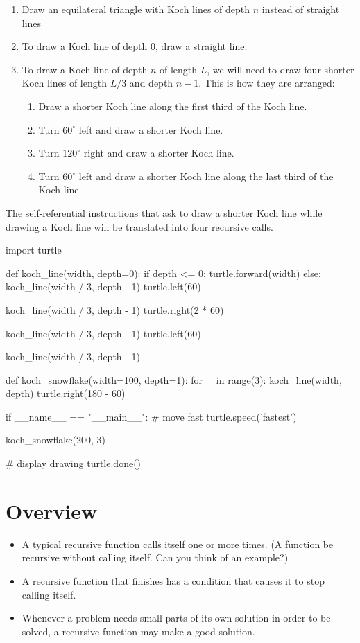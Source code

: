 \documentclass[11pt]{cselabheader}
\begin{document}
\begin{enumerate}
\item Draw an equilateral triangle with Koch lines of depth $n$
instead of straight lines
\item To draw a Koch line of depth $0$, draw a straight line.
\item To draw a Koch line of depth $n$ of length $L$, we will need to
draw four shorter Koch lines of length $L / 3$ and depth $n-1$.  This
is how they are arranged:
\begin{enumerate}
\item Draw a shorter Koch line along the first third of the Koch line.
\item Turn $60^\circ$ left and draw a shorter Koch line.
\item Turn $120^\circ$ right and draw a shorter Koch line.
\item Turn $60^\circ$ left and draw a shorter Koch line along the last
third of the Koch line.
\end{enumerate}
\end{enumerate}

The self-referential instructions that ask to draw a shorter Koch line
while drawing a Koch line will be translated into four recursive calls.

\begin{python3code}
import turtle

def koch_line(width, depth=0):
    if depth <= 0:
        turtle.forward(width)
    else:
        koch_line(width / 3, depth - 1)
        turtle.left(60)

        koch_line(width / 3, depth - 1)
        turtle.right(2 * 60)

        koch_line(width / 3, depth - 1)
        turtle.left(60)

        koch_line(width / 3, depth - 1)

def koch_snowflake(width=100, depth=1):
    for _ in range(3):
        koch_line(width, depth)
        turtle.right(180 - 60)

if __name__ == "__main__":
    # move fast
    turtle.speed('fastest')

    koch_snowflake(200, 3)

    # display drawing
    turtle.done()
\end{python3code}

\newpage
\section{Overview}
\begin{itemize}
\item A typical recursive function calls itself one or more times.
     (A function be recursive without calling itself. Can you think of an example?)
\item A recursive function that finishes has a condition that causes
it to stop calling itself.
\item Whenever a problem needs small parts of its own solution in
order to be solved, a recursive function may make a good solution.
\end{itemize}
\end{document}
